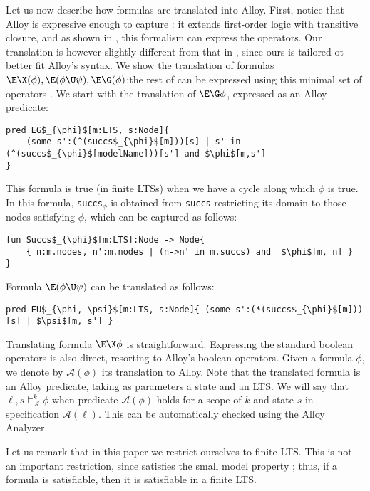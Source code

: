 Let us now describe how \ctl{} formulas are translated into Alloy. First, notice that Alloy is expressive enough to capture \ctl{}: it extends first-order logic with transitive closure, and as shown in \cite{ImmermanVardi97}, this formalism can express the \ctl{} operators. Our translation is however slightly different from that in \cite{ImmermanVardi97}, since ours is tailored ot better fit Alloy's syntax. We show the translation of formulas $\E\X(\phi), \E(\phi \U \psi), \E \G(\phi)$;the rest of \ctl{} can be expressed using this minimal set of operators \cite{Katoen08}. We start with the translation of $\E \G \phi$, expressed as an Alloy predicate:
\begin{lstlisting}[style=Alloy,basicstyle=\tiny,mathescape=true]
pred EG$_{\phi}$[m:LTS, s:Node]{
	(some s':(^(succs$_{\phi}$[m]))[s] | s' in (^(succs$_{\phi}$[modelName]))[s'] and $\phi$[m,s']
}
\end{lstlisting}
This formula is true (in finite LTSs) when we have a cycle along which $\phi$ is true. In this formula, \verb"succs"$_{\phi}$ is obtained from \verb"succs" restricting its domain to those nodes satisfying $\phi$, which can be captured as follows:
\begin{lstlisting}[style=Alloy,basicstyle=\tiny,mathescape=true]
fun Succs$_{\phi}$[m:LTS]:Node -> Node{
	{ n:m.nodes, n':m.nodes | (n->n' in m.succs) and  $\phi$[m, n] }
}
\end{lstlisting}
Formula $\E(\phi \U \psi)$ can be translated as follows:
\begin{lstlisting}[style=Alloy,basicstyle=\tiny,mathescape=true]
pred EU$_{\phi, \psi}$[m:LTS, s:Node]{ (some s':(*(succs$_{\phi}$[m]))[s] | $\psi$[m, s'] }
\end{lstlisting}
Translating formula $\E\X \phi$ is straightforward. Expressing the standard boolean operators is also direct, resorting to Alloy's boolean operators. Given a formula $\phi$, we denote by $\mathcal{A}(\phi)$ its translation to Alloy. Note that the translated formula is an Alloy predicate, taking as parameters a state and an LTS. We will say that $\ell, s \vDash^k_{\mathcal{A}} \phi$ when predicate $\mathcal{A}(\phi)$ holds for a scope of $k$ and state $s$ in specification $\mathcal{A}(\ell)$. This can be automatically checked using the Alloy Analyzer. 

Let us remark that in this paper we restrict ourselves to finite LTS. This is not an important restriction, since \ctl{} satisfies the small model property \cite{Emerson90}; thus, if a formula is satisfiable, then it is satisfiable in a finite LTS.

